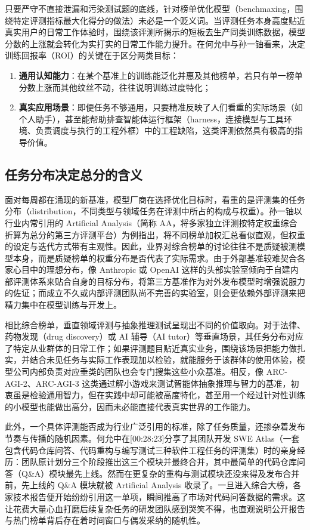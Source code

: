 \documentclass[UTF8,a4paper,11pt,fontset=fandol]{ctexart}
\begin{document}
只要严守不直接泄漏和污染测试题的底线，针对榜单优化模型（benchmaxing，围绕特定评测指标最大化得分的做法）未必是一个贬义词。当评测任务本身高度贴近真实用户的日常工作体验时，围绕该评测所揭示的短板去生产同类训练数据，模型分数的上涨就会转化为实打实的日常工作能力提升。在何允中与孙一铀看来，决定训练回报率（ROI）的关键在于区分两类目标：
\begin{enumerate}
\item \textbf{通用认知能力}：在某个基准上的训练能泛化并惠及其他榜单，若只有单一榜单分数上涨而其他纹丝不动，往往说明训练过度特化；
\item \textbf{真实应用场景}：即便任务不够通用，只要精准反映了人们看重的实际场景（如个人助手），甚至能帮助排查智能体运行框架（harness，连接模型与工具环境、负责调度与执行的工程外框）中的工程缺陷，这类评测依然具有极高的指导价值。
\end{enumerate}

\subsection{任务分布决定总分的含义}
面对每周都在涌现的新基准，模型厂商在选择优化目标时，看重的是评测集的任务分布（distribution，不同类型与领域任务在评测中所占的构成与权重）。孙一铀以行业内常引用的 Artificial Analysis（简称 AA，将多家独立评测按特定权重综合折算为总分的第三方评测平台）为例指出，将不同榜单加权汇总看似直观，但权重的设定与迭代方式带有主观性。因此，业界对综合榜单的讨论往往不是质疑被测模型本身，而是质疑榜单的权重分布是否代表了实际需求。由于外部基准较难契合各家心目中的理想分布，像 Anthropic 或 OpenAI 这样的头部实验室倾向于自建内部评测体系来贴合自身的目标分布，将第三方基准作为对外发布模型时增强说服力的佐证；而成立不久或内部评测团队尚不完善的实验室，则会更依赖外部评测来把精力集中在模型训练与开发上。

相比综合榜单，垂直领域评测与抽象推理测试呈现出不同的价值取向。对于法律、药物发现（drug discovery）或 AI 辅导（AI tutor）等垂直场景，其任务分布对应了特定从业群体的日常工作；如果评测题目贴近真实业务，围绕该场景把能力做扎实，并结合未见任务与实际工作表现加以检验，就能服务于该群体的使用体验，模型公司内部负责对应垂类的团队也会专门搜集这些小众基准。相反，像 ARC-AGI-2、ARC-AGI-3 这类通过解小游戏来测试智能体抽象推理与智力的基准，初衷虽是检验通用智力，但在实践中却可能被高度特化，甚至用一个经过针对性训练的小模型也能做出高分，因而未必能直接代表真实世界的工作能力。

此外，一个具体评测能否成为行业广泛引用的标准，除了任务质量，还掺杂着发布节奏与传播的随机因素。何允中在[00:28:23]分享了其团队开发 SWE Atlas（一套包含代码仓库问答、代码重构与编写测试三种软件工程任务的评测集）时的亲身经历：团队原计划分三个阶段推出这三个模块并最终合并，其中最简单的代码仓库问答（Q\&A）模块最先上线。然而在更复杂的重构与测试模块还没来得及发布合并前，先上线的 Q\&A 模块就被 Artificial Analysis 收录了。一旦进入综合大榜，各家技术报告便开始纷纷引用这一单项，瞬间推高了市场对代码问答数据的需求。这让花费大量心血打磨后续复杂任务的研发团队感到哭笑不得，也直观说明公开报告与热门榜单背后存在着时间窗口与偶发采纳的随机性。
\end{document}
